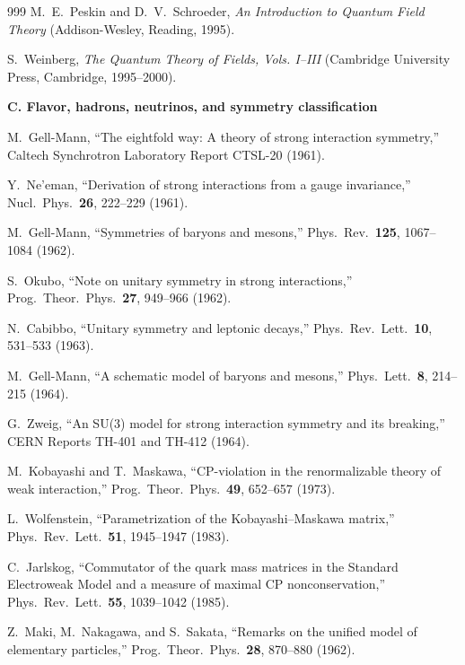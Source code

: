 \begin{thebibliography}{999}
M.~E.~Peskin and D.~V.~Schroeder,
\emph{An Introduction to Quantum Field Theory}
(Addison-Wesley, Reading, 1995).

S.~Weinberg,
\emph{The Quantum Theory of Fields, Vols. I--III}
(Cambridge University Press, Cambridge, 1995--2000).

\item[]\textbf{C. Flavor, hadrons, neutrinos, and symmetry classification}

M.~Gell-Mann,
``The eightfold way: A theory of strong interaction symmetry,''
Caltech Synchrotron Laboratory Report CTSL-20 (1961).

Y.~Ne'eman,
``Derivation of strong interactions from a gauge invariance,''
Nucl.\ Phys.\ \textbf{26}, 222--229 (1961).

M.~Gell-Mann,
``Symmetries of baryons and mesons,''
Phys.\ Rev.\ \textbf{125}, 1067--1084 (1962).

S.~Okubo,
``Note on unitary symmetry in strong interactions,''
Prog.\ Theor.\ Phys.\ \textbf{27}, 949--966 (1962).

N.~Cabibbo,
``Unitary symmetry and leptonic decays,''
Phys.\ Rev.\ Lett.\ \textbf{10}, 531--533 (1963).

M.~Gell-Mann,
``A schematic model of baryons and mesons,''
Phys.\ Lett.\ \textbf{8}, 214--215 (1964).

G.~Zweig,
``An SU(3) model for strong interaction symmetry and its breaking,''
CERN Reports TH-401 and TH-412 (1964).

M.~Kobayashi and T.~Maskawa,
``CP-violation in the renormalizable theory of weak interaction,''
Prog.\ Theor.\ Phys.\ \textbf{49}, 652--657 (1973).

L.~Wolfenstein,
``Parametrization of the Kobayashi--Maskawa matrix,''
Phys.\ Rev.\ Lett.\ \textbf{51}, 1945--1947 (1983).

C.~Jarlskog,
``Commutator of the quark mass matrices in the Standard Electroweak Model and
a measure of maximal CP nonconservation,''
Phys.\ Rev.\ Lett.\ \textbf{55}, 1039--1042 (1985).

Z.~Maki, M.~Nakagawa, and S.~Sakata,
``Remarks on the unified model of elementary particles,''
Prog.\ Theor.\ Phys.\ \textbf{28}, 870--880 (1962).


\end{thebibliography}
